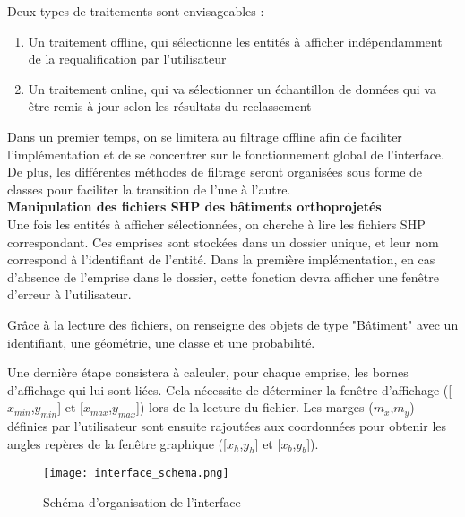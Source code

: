\noindent Deux types de traitements sont envisageables : 
\begin{enumerate}
	\item Un traitement offline, qui sélectionne les entités à afficher indépendamment de la requalification par l’utilisateur
	\item Un traitement online, qui va sélectionner un échantillon de données qui va être remis à jour selon les résultats du reclassement
\end{enumerate}

Dans un premier temps, on se limitera au filtrage offline afin de faciliter l'implémentation et de se concentrer sur le fonctionnement global de l’interface. De plus, les différentes méthodes de filtrage seront organisées sous forme de classes pour faciliter la transition de l'une à l'autre. \\

\noindent\textbf{Manipulation des fichiers SHP des bâtiments orthoprojetés}\\

Une fois les entités à afficher sélectionnées, on cherche à lire les fichiers SHP correspondant. Ces emprises sont stockées dans un dossier unique, et leur nom correspond à l'identifiant de l'entité. Dans la première implémentation, en cas d’absence de l’emprise dans le dossier, cette fonction devra afficher une fenêtre d’erreur à l’utilisateur.\newline 

Grâce à la lecture des fichiers, on renseigne des objets de type "Bâtiment" avec un identifiant, une géométrie, une classe et une probabilité. \newline

Une dernière étape consistera à calculer, pour chaque emprise, les bornes d’affichage qui lui sont liées. Cela nécessite de déterminer la fenêtre d’affichage ([$x_{min}$,$y_{min}$] et [$x_{max}$,$y_{max}$]) lors de la lecture du fichier. Les marges ($m_x$,$m_y$) définies par l’utilisateur sont ensuite rajoutées aux coordonnées pour obtenir les angles repères de la fenêtre graphique ([$x_h$,$y_h$] et [$x_b$,$y_b$]).\newline

\begin{figure}[H]
	\begin{center}
		\texttt{[image: interface\_schema.png]}  \\
		\caption[Schéma d'organisation de l'interface]{Schéma d'organisation de l'interface}
		\label{fig:interfaceschema}
	\end{center}
\end{figure}

